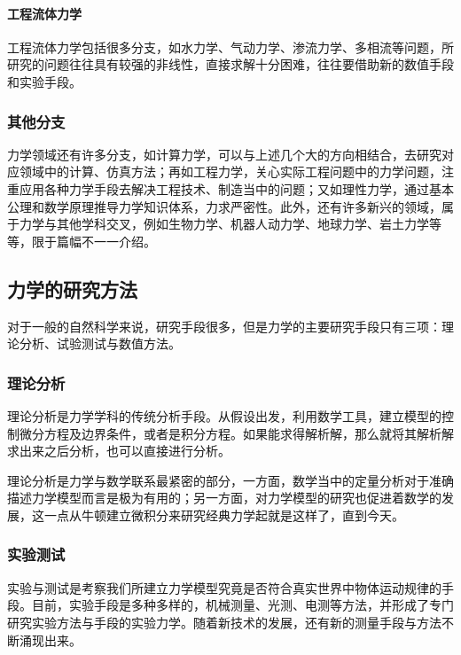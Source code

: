\paragraph{工程流体力学}

工程流体力学包括很多分支，如水力学、气动力学、渗流力学、多相流等问题，所研究的问题往往具有较强的非线性，直接求解十分困难，往往要借助新的数值手段和实验手段。

\subsubsection{其他分支}

力学领域还有许多分支，如计算力学，可以与上述几个大的方向相结合，去研究对应领域中的计算、仿真方法；再如工程力学，关心实际工程问题中的力学问题，注重应用各种力学手段去解决工程技术、制造当中的问题；又如理性力学，通过基本公理和数学原理推导力学知识体系，力求严密性。此外，还有许多新兴的领域，属于力学与其他学科交叉，例如生物力学、机器人动力学、地球力学、岩土力学等等，限于篇幅不一一介绍。

\subsection{力学的研究方法}

对于一般的自然科学来说，研究手段很多，但是力学的主要研究手段只有三项：理论分析、试验测试与数值方法。

\subsubsection{理论分析}

理论分析是力学学科的传统分析手段。从假设出发，利用数学工具，建立模型的控制微分方程及边界条件，或者是积分方程。如果能求得解析解，那么就将其解析解求出来之后分析，也可以直接进行分析。

理论分析是力学与数学联系最紧密的部分，一方面，数学当中的定量分析对于准确描述力学模型而言是极为有用的；另一方面，对力学模型的研究也促进着数学的发展，这一点从牛顿建立微积分来研究经典力学起就是这样了，直到今天。

\subsubsection{实验测试}

实验与测试是考察我们所建立力学模型究竟是否符合真实世界中物体运动规律的手段。目前，实验手段是多种多样的，机械测量、光测、电测等方法，并形成了专门研究实验方法与手段的实验力学。随着新技术的发展，还有新的测量手段与方法不断涌现出来。


